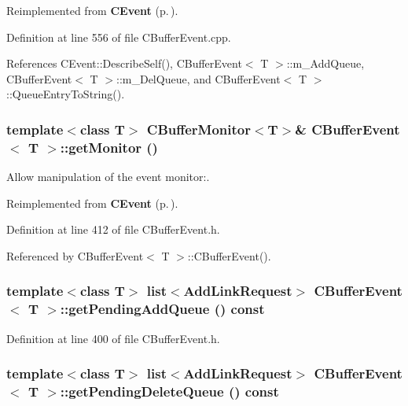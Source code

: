 Reimplemented from {\bf CEvent} {\rm (p.\,\pageref{classCEvent_a16})}.

Definition at line 556 of file CBuffer\-Event.cpp.

References CEvent::Describe\-Self(), CBuffer\-Event$<$ T $>$::m\_\-Add\-Queue, CBuffer\-Event$<$ T $>$::m\_\-Del\-Queue, and CBuffer\-Event$<$ T $>$::Queue\-Entry\-To\-String().
\subsubsection{\setlength{\rightskip}{0pt plus 5cm}template$<$class T$>$ {\bf CBuffer\-Monitor}$<$T$>$\& CBuffer\-Event$<$ T $>$::get\-Monitor ()\hspace{0.3cm}{\tt  [inline]}}\label{classCBufferEvent_a6}


Allow manipulation of the event monitor:.



Reimplemented from {\bf CEvent} {\rm (p.\,\pageref{classCEvent_a8})}.

Definition at line 412 of file CBuffer\-Event.h.

Referenced by CBuffer\-Event$<$ T $>$::CBuffer\-Event().
\subsubsection{\setlength{\rightskip}{0pt plus 5cm}template$<$class T$>$ list$<${\bf Add\-Link\-Request}$>$ CBuffer\-Event$<$ T $>$::get\-Pending\-Add\-Queue () const\hspace{0.3cm}{\tt  [inline]}}\label{classCBufferEvent_a4}




Definition at line 400 of file CBuffer\-Event.h.
\subsubsection{\setlength{\rightskip}{0pt plus 5cm}template$<$class T$>$ list$<${\bf Add\-Link\-Request}$>$ CBuffer\-Event$<$ T $>$::get\-Pending\-Delete\-Queue () const\hspace{0.3cm}{\tt  [inline]}}\label{classCBufferEvent_a5}




